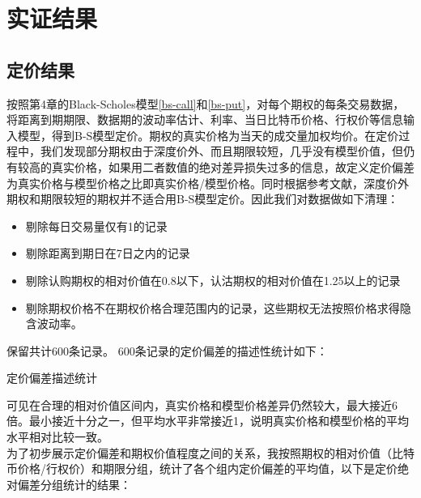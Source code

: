 \chapter{实证结果}
\section{定价结果}
按照第4章的Black-Scholes模型\ref{bs-call}和\ref{bs-put}，对每个期权的每条交易数据，将距离到期期限、数据期的波动率估计、利率、当日比特币价格、行权价等信息输入模型，得到B-S模型定价。期权的真实价格为当天的成交量加权均价。在定价过程中，我们发现部分期权由于深度价外、而且期限较短，几乎没有模型价值，但仍有较高的真实价格，如果用二者数值的绝对差异损失过多的信息，故定义定价偏差为真实价格与模型价格之比即真实价格/模型价格。同时根据参考文献，深度价外期权和期限较短的期权并不适合用B-S模型定价\cite{10.2307/1831029}\cite{Jame-1979}。因此我们对数据做如下清理：
\begin{itemize}
    \item 剔除每日交易量仅有1的记录
    \item 剔除距离到期日在7日之内的记录
    \item 剔除认购期权的相对价值在0.8以下，认沽期权的相对价值在1.25以上的记录
    \item 剔除期权价格不在期权价格合理范围内的记录，这些期权无法按照价格求得隐含波动率。
\end{itemize}
保留共计600条记录。
600条记录的定价偏差的描述性统计如下：
~\\
\begin{center}
    \begin{threeparttable}[H]
    
        \begin{small}
            \caption{定价偏差描述统计}
            \label{tab:option_bias_group}
                
                
        \end{small}
    \end{threeparttable}
\end{center}
可见在合理的相对价值区间内，真实价格和模型价格差异仍然较大，最大接近6倍。最小接近十分之一，但平均水平非常接近1，说明真实价格和模型价格的平均水平相对比较一致。
~\\
为了初步展示定价偏差和期权价值程度之间的关系，我按照期权的相对价值（比特币价格/行权价）和期限分组，统计了各个组内定价偏差的平均值，以下是定价绝对偏差分组统计的结果：
~\\
